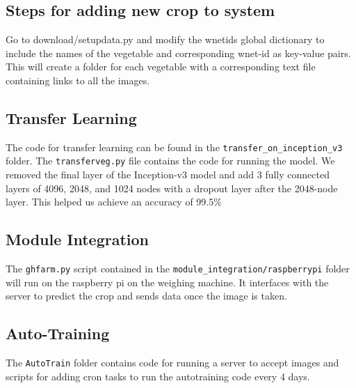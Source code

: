 \documentclass[a4paper,12pt,oneside]{book}
\begin{document}
\subsection{Steps for adding new crop to system}
Go to download\textunderscoredata/setupdata.py and modify the wnetids global dictionary to include the names of the vegetable and corresponding wnet-id as key-value pairs. This will create a folder for each vegetable with a corresponding text file containing links to all the images.

\subsection{Transfer Learning}
The code for transfer learning can be found in the \texttt{transfer\_on\_inception\_v3} folder. The \texttt{transferveg.py} file contains the code for running the model.
We removed the final layer of the Inception-v3 model and add 3 fully connected layers of 4096, 2048, and 1024 nodes with a dropout layer after the 2048-node layer.
This helped us achieve an accuracy of 99.5\%

\subsection{Module Integration}
The \texttt{ghfarm.py} script contained in the \texttt{module\_integration/raspberrypi} folder will run on the raspberry pi on the weighing machine. It interfaces with the server to predict the crop and sends data once the image is taken.

\subsection{Auto-Training}
The \texttt{AutoTrain} folder contains code for running a server to accept images and scripts for adding cron tasks to run the autotraining code every 4 days.
\end{document}
